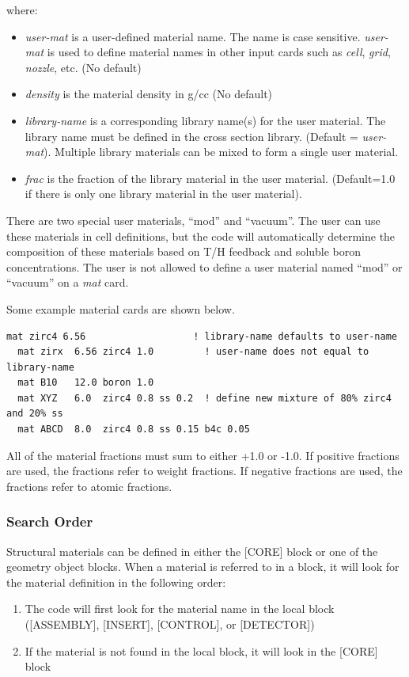 where:
\begin{itemize}
\item {\it user-mat} is a user-defined material name.  The name is case sensitive.  {\it user-mat} is used to
define material names in other input cards such as {\it cell}, {\it grid}, {\it nozzle}, etc. (No default)
\item {\it density} is the material density in g/cc (No default)
\item {\it library-name} is a corresponding library name(s) for the user material.  The library name
must be defined in the cross section library. (Default = {\it user-mat}).  Multiple library materials
can be mixed to form a single user material.
\item {\it frac}  is the fraction of the library material in the user material. (Default=1.0 if there is only one library material in the user material).
\end{itemize}

There are two special user materials,  ``mod'' and ``vacuum''.
The user can use these materials in cell definitions, but the code will automatically
determine the composition of these materials  based on T/H feedback and soluble boron concentrations.
The user is not allowed to define a user material named ``mod'' or ``vacuum'' on a {\it mat} card.

Some example material cards are shown below.
\begin{Verbatim}[fontsize=\small]
  mat zirc4 6.56                   ! library-name defaults to user-name
  mat zirx  6.56 zirc4 1.0         ! user-name does not equal to library-name
  mat B10   12.0 boron 1.0
  mat XYZ   6.0  zirc4 0.8 ss 0.2  ! define new mixture of 80% zirc4 and 20% ss
  mat ABCD  8.0  zirc4 0.8 ss 0.15 b4c 0.05
\end{Verbatim}

All of the material fractions must sum to either +1.0 or -1.0.
If positive fractions are used, the fractions refer to weight fractions.
If negative fractions are used, the fractions refer to atomic fractions.

\subsubsection{Search Order}

Structural materials can be defined in either the [CORE] block or one of the
geometry object blocks.  When a material is referred to in a block, it will look
for the material definition in the following order:
\begin{enumerate}  %
 \item The code will first look for the material name in the local block ([ASSEMBLY], [INSERT], [CONTROL], or [DETECTOR])
 \item If the material is not found in the local block, it will look in the [CORE] block
\end{enumerate}

